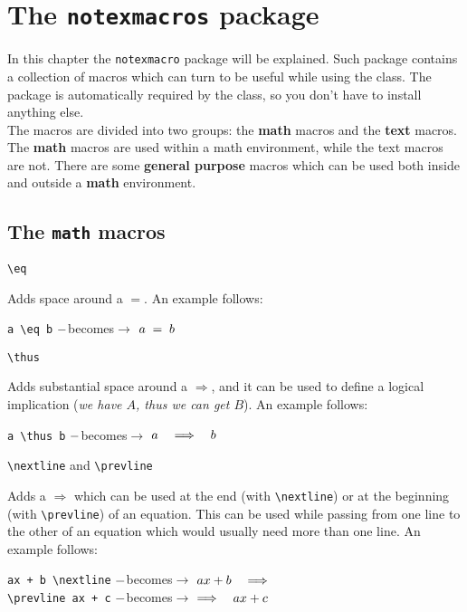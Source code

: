 \documentclass[]{notex}
\newcommand{\becomes}[1]{\hspace{#1} $\--$becomes$\rightarrow$ \hspace{#1}}
\begin{document}
\chapter{The \texttt{notexmacros} package}

\noindent In this chapter the \texttt{notexmacro} package will be explained. Such package contains a collection of macros which can turn to be useful while using the class. The package is automatically required by the class, so you don't have to install anything else.
\\
\indent The macros are divided into two groups: the \textbf{math} macros and the \textbf{text} macros. The \textbf{math} macros are used within a math environment, while the text macros are not. There are some \textbf{general purpose} macros which can be used both inside and outside a \textbf{math} environment.

\section{The \texttt{math} macros}

\begin{tcolorbox}
    \verb|\eq|
\end{tcolorbox}

\noindent Adds space around a $=$. An example follows:
\begin{center}
    \verb|a \eq b| \becomes{20pt} $a \; = \; b$
\end{center}

\begin{tcolorbox}
    \verb|\thus|
\end{tcolorbox}

\noindent Adds substantial space around a $\Longrightarrow$, and it can be used to define a logical implication (\textit{we have $A$, thus we can get $B$}). An example follows:
\begin{center}
    \verb|a \thus b| \becomes{20pt} $a \quad \Longrightarrow \quad b$
\end{center}

\begin{tcolorbox}
    \verb|\nextline| and \verb|\prevline|
\end{tcolorbox}

\noindent Adds a $\Longrightarrow$ which can be used at the end (with \verb|\nextline|) or at the beginning (with \verb|\prevline|) of an equation. This can be used while passing from one line to the other of an equation which would usually need more than one line. An example follows:
\begin{center}
    \verb|ax + b \nextline| \becomes{20pt} $ax + b \quad \Longrightarrow$ \\
    \verb|\prevline ax + c| \becomes{20pt} $\Longrightarrow \quad ax + c$
\end{center}
\end{document}
